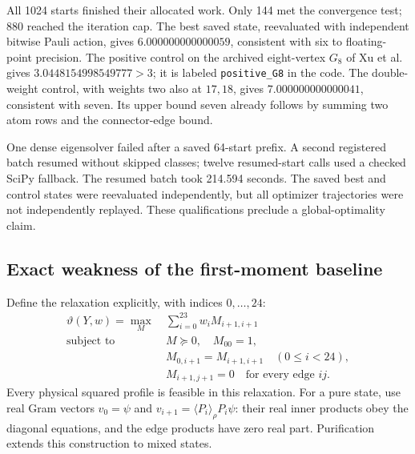 \documentclass[11pt,a4paper]{article}
\theoremstyle{remark}\newtheorem{remark}[theorem]{Remark}
\newcommand{\ev}[1]{\langle#1\rangle_\rho}
\newcommand{\artifact}[1]{\nolinkurl{#1}}
\begin{document}
All 1024 starts finished their allocated work. Only 144 met the
convergence test; 880 reached the iteration cap. The best saved state,
reevaluated with independent bitwise Pauli action, gives
$6.000000000000059$, consistent with six to floating-point precision.
The positive control on the archived eight-vertex $G_8$ of Xu et al.\
\cite[Fig.~11(a)]{xu} gives $3.0448154998549777>3$; it is labeled
\artifact{positive_G8} in the code.
The double-weight control, with weights two also at $17,18$, gives
$7.000000000000041$, consistent with seven. Its upper bound seven
already follows by summing two atom rows and the connector-edge bound.

One dense eigensolver failed after a saved 64-start prefix. A second
registered batch resumed without skipped classes; twelve resumed-start
calls used a checked SciPy fallback. The resumed batch took 214.594
seconds. The saved best and control states were reevaluated
independently, but all optimizer trajectories were not independently
replayed. These qualifications preclude a global-optimality claim.

\subsection{Exact weakness of the first-moment baseline}
Define the relaxation explicitly, with indices $0,\ldots,24$:
\begin{equation}\label{eq:theta}
 \begin{aligned}
 \vartheta(Y,w)=\max_M\ &\sum_{i=0}^{23}w_iM_{i+1,i+1}\\
 \text{subject to }\ &M\succeq0,\quad M_{00}=1,\\
 &M_{0,i+1}=M_{i+1,i+1}\quad(0\leq i<24),\\
 &M_{i+1,j+1}=0\quad\text{for every edge }ij.
 \end{aligned}
\end{equation}
Every physical squared profile is feasible in this relaxation. For a
pure state, use real Gram vectors $v_0=\psi$ and
$v_{i+1}=\ev{P_i}P_i\psi$: their real inner products obey the diagonal
equations, and the edge products have zero real part. Purification
extends this construction to mixed states.
\end{document}
